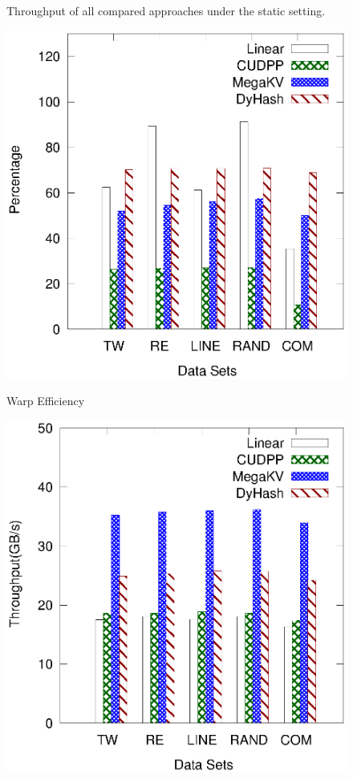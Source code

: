 \begin{figure}[h]
\begin{minipage}{0.48\linewidth}
	\centerline{}
	\end{minipage}
	\caption{Throughput of all compared approaches under the static setting.}
	\label{fig:static}
\end{figure}

\begin{figure}[h]
	\begin{minipage}{0.3\linewidth}\centering
		\includegraphics[width=\linewidth]{pic/static-profi/warp.eps}
		\centerline{Warp Efficiency}
	\end{minipage}
	\hfill
	\begin{minipage}{0.3\linewidth}\centering
	\includegraphics[width=\linewidth]{pic/static-profi/memory-read.eps}

\end{minipage}
\end{figure}
